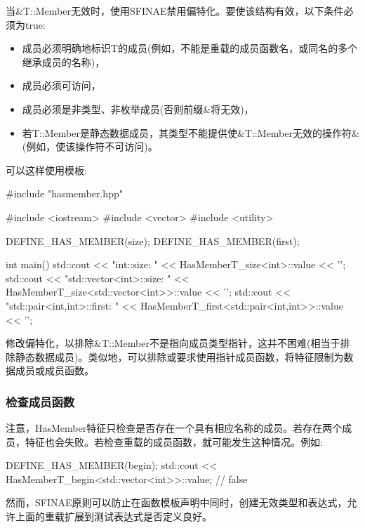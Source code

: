 当\&T::Member无效时，使用SFINAE禁用偏特化。要使该结构有效，以下条件必须为true:

\begin{itemize}
\item
成员必须明确地标识T的成员(例如，不能是重载的成员函数名，或同名的多个继承成员的名称)，

\item
成员必须可访问，

\item
成员必须是非类型、非枚举成员(否则前缀\&将无效)，

\item
若T::Member是静态数据成员，其类型不能提供使\&T::Member无效的操作符\&(例如，使该操作符不可访问)。
\end{itemize}

可以这样使用模板:

\begin{cpp}
#include "hasmember.hpp"

#include <iostream>
#include <vector>
#include <utility>

DEFINE_HAS_MEMBER(size);
DEFINE_HAS_MEMBER(first);

int main()
{
	std::cout << "int::size: "
				<< HasMemberT_size<int>::value << ’\n’;
	std::cout << "std::vector<int>::size: "
				<< HasMemberT_size<std::vector<int>>::value << ’\n’;
	std::cout << "std::pair<int,int>::first: "
				<< HasMemberT_first<std::pair<int,int>>::value << ’\n’;
}
\end{cpp}

修改偏特化，以排除\&T::Member不是指向成员类型指针，这并不困难(相当于排除静态数据成员)。类似地，可以排除或要求使用指针成员函数，将特征限制为数据成员或成员函数。

\subsubsection{检查成员函数}

注意，HasMember特征只检查是否存在一个具有相应名称的成员。若存在两个成员，特征也会失败。若检查重载的成员函数，就可能发生这种情况。例如:

\begin{cpp}
DEFINE_HAS_MEMBER(begin);
std::cout << HasMemberT_begin<std::vector<int>>::value; // false
\end{cpp}

然而，SFINAE原则可以防止在函数模板声明中同时，创建无效类型和表达式，允许上面的重载扩展到测试表达式是否定义良好。


